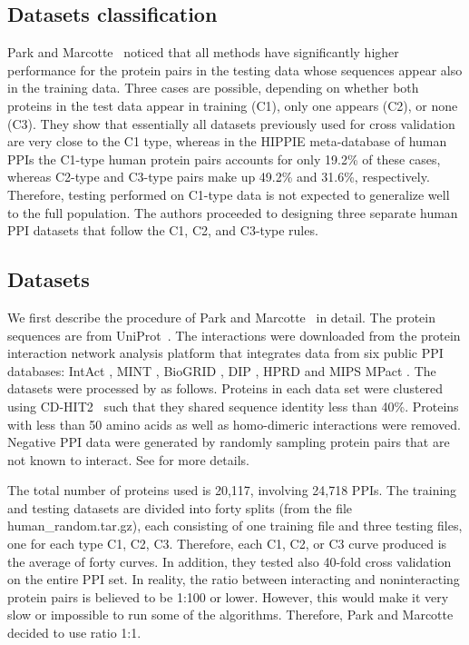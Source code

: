 \subsection{Datasets classification}
Park and Marcotte~\cite{ParkMarcotte12_C123} noticed that all methods have significantly higher performance for the protein pairs in the testing data whose sequences appear also in the training data. Three cases are possible, depending on whether both proteins in the test data appear in training (C1), only one appears (C2), or none (C3). They show that essentially all datasets previously used for cross validation are very close to the C1 type, whereas in the HIPPIE meta-database of human PPIs \cite{Schaefer12_HIPPIE} the C1-type human protein pairs accounts for only 19.2\% of these cases, whereas C2-type and C3-type pairs make up 49.2\% and 31.6\%, respectively. Therefore, testing performed on C1-type data is not expected to generalize well to the full population. The authors proceeded to designing three separate human PPI datasets that follow the C1, C2, and C3-type rules. 

\subsection{Datasets}
We first describe the procedure of Park and Marcotte~\cite{ParkMarcotte12_C123} in detail. The protein sequences are from UniProt~\cite{uniprot2012reorganizing}. The interactions were downloaded from the protein interaction network analysis platform \cite{Wu09_PINA} that integrates data from six public PPI databases: IntAct \cite{Kerrien07_IntAct}, MINT \cite{Chatr07_MINT}, BioGRID \cite{Stark11_BioGRID}, DIP \cite{Salwinski04_DIP}, HPRD \cite{Prasad09_HPRD} and MIPS MPact \cite{Guldener06_MIPS_MPact}. The datasets were processed by \cite{ParkMarcotte12_C123} as follows. Proteins in each data set were clustered using CD-HIT2~\cite{li2006cd} such that they shared sequence identity less than 40\%. Proteins with less than 50 amino acids as well as homo-dimeric interactions were removed. Negative PPI data were generated by randomly sampling protein pairs that are not known to interact. See \cite{ParkMarcotte12_C123} for more details.

The total number of proteins used is 20,117, involving 24,718 PPIs. The training and testing datasets are divided into forty splits (from the file human\_random.tar.gz), each consisting of one training file and three testing files, one for each type C1, C2, C3.  Therefore, each C1, C2, or C3 curve produced is the average of forty curves. In addition, they tested also 40-fold cross validation on the entire PPI set. In reality, the ratio between interacting and noninteracting protein pairs is believed to be 1:100 or lower. However, this would make it very slow or impossible to run some of the algorithms. Therefore, Park and Marcotte decided to use ratio 1:1.

